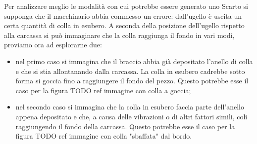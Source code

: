 Per analizzare meglio le modalità con cui potrebbe essere generato uno Scarto si supponga che il macchinario abbia commesso un errore: dall'ugello è uscita un certa quantità di colla in esubero.
A seconda della posizione dell'ugello rispetto alla carcassa si può immaginare che la colla raggiunga il fondo in vari modi, proviamo ora ad esplorarne due:
\begin{itemize}
  \item nel primo caso si immagina che il braccio abbia già depositato l'anello di colla e che si stia allontanando dalla carcassa.
    La colla in esubero cadrebbe sotto forma si goccia fino a raggiungere il fondo del pezzo.
    Questo potrebbe esse il caso per la figura TODO ref immagine con colla a goccia;
  \item nel secondo caso si immagina che la colla in esubero faccia parte dell'anello appena depositato e che, a causa delle vibrazioni o di altri fattori simili, coli raggiungendo il fondo della carcassa.
    Questo potrebbe esse il caso per la figura TODO ref immagine con colla "sbaffata" dal bordo.
\end{itemize}











